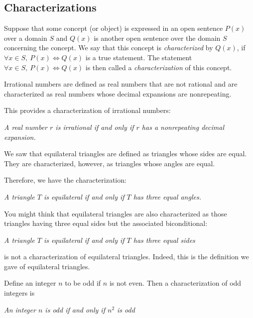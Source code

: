 \subsection{Characterizations}
\begin{defi}[Characterization]
    Suppose that some concept (or object) is expressed in an
    open sentence $P(x)$ over a domain $S$ and $Q(x)$ is 
    another open sentence over the domain $S$ concerning the 
    concept. We say that this concept is \emph{characterized}
    by $Q(x)$, if $\forall x \in S,\: P(x) \Leftrightarrow 
    Q(x)$ is a true statement. The statement $\forall x \in S,\:
    P(x) \Leftrightarrow Q(x)$ is then called a \emph{characterization} 
    of this concept.
\end{defi}
\begin{eg}
    Irrational numbers are defined as real numbers that are not 
    rational and are characterized as real numbers whose decimal
     expansions are nonrepeating.
    
     This provides a characterization of irrational numbers:
     \begin{center}
          \textit{A real number $r$ is irrational if and only if $r$ has 
          a nonrepeating decimal expansion.}
     \end{center}
\end{eg}
\begin{eg}
    We saw that equilateral triangles are defined as triangles 
    whose sides are equal. They are characterized, however, 
    as triangles whose angles are equal.

    Therefore, we have the characterization:
    \begin{center}
         \textit{A triangle $T$ is equilateral if and only if 
         $T$ has three equal angles.}
    \end{center}
\end{eg}

You might think that equilateral triangles are also characterized 
as those triangles having three equal sides but the associated
 biconditional:
 \begin{center}
      \textit{A triangle $T$ is equilateral if and only 
      if $T$ has three equal sides}
 \end{center}
 is not a characterization of equilateral triangles. Indeed, this is 
 the definition we gave of equilateral triangles.
 \begin{eg}
    Define an integer $n$ to be odd if $n$ is not even. Then a 
    characterization of odd integers is
    \begin{center}
         \textit{An integer $n$ is odd if and only if $n^2$ is 
         odd}
    \end{center}
 \end{eg}